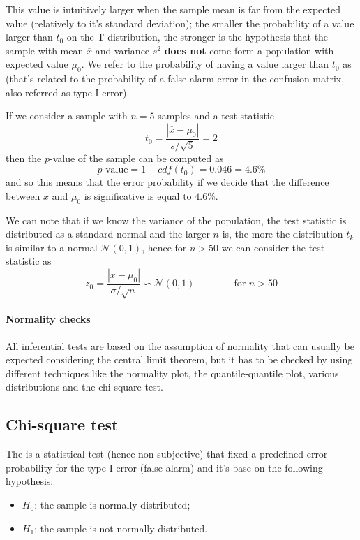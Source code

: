 	This value is intuitively larger when the sample mean is far from the expected value (relatively to it's standard deviation); the smaller the probability of a value larger than $t_0$ on the T distribution, the stronger is the hypothesis that the sample with mean $\overline x$ and variance $s^2$ \textbf{does not} come form a population with expected value $\mu_0$. We refer to the probability of having a value larger than $t_0$ as  (that's related to the probability of a false alarm error in the confusion matrix, also referred as type I error).
		
	\begin{example}{}
		If we consider a sample with $n = 5$ samples and a test statistic
		\[ t_0 = \frac{|\overline x- \mu_0|}{s/\sqrt 5} = 2 \]
		then the $p$-value of the sample can be computed as
		\[  p\textrm{-value} = 1 - cdf(t_0) = 0.046 = 4.6\% \]
		and so this means that the error probability if we decide that the difference between $\overline x$ and $\mu_0$ is significative is equal to $4.6\%$.
	\end{example}
	
	We can note that if we know the variance of the population, the test statistic is distributed as a standard normal and the larger $n$ is, the more the distribution $t_k$ is similar to a normal $\mathcal N(0,1)$, hence for $n>50$ we can consider the test statistic as
	\[ z_0 = \frac{|\overline x-\mu_0|}{\sigma/\sqrt n} \backsim \mathcal N(0,1) \qquad \qquad \textrm{for } n >50 \] 
	
	\paragraph{Normality checks} All inferential tests are based on the assumption of normality that can usually be expected considering the central limit theorem, but it has to be checked by using different techniques like the normality plot, the quantile-quantile plot, various distributions and the chi-square test.
			
\subsection{Chi-square test}
	
	The  is a statistical test (hence non subjective) that fixed a predefined error probability for the type I error (false alarm) and it's base on the following hypothesis:
	\begin{itemize}
		\item $H_0$: the sample is normally distributed;
		\item $H_1$: the sample is not normally distributed.
	\end{itemize}
	

